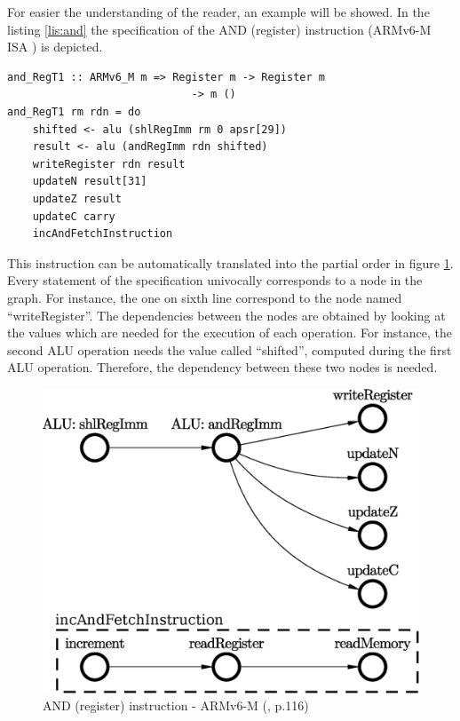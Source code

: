 \documentclass[conference]{IEEEtran}
\begin{document}
For easier the understanding of the reader, an example will be showed. In the listing
\ref{lis:and} the specification of the AND (register) instruction (ARMv6-M ISA
\cite{armManual}) is depicted.

\begin{lstlisting}[caption="AND (register) instruction - Haskell-based specification",
frame=single, label=lis:and]
and_RegT1 :: ARMv6_M m => Register m -> Register m 
			 				 -> m ()
and_RegT1 rm rdn = do
    shifted <- alu (shlRegImm rm 0 apsr[29])
    result <- alu (andRegImm rdn shifted)
    writeRegister rdn result
    updateN result[31]
    updateZ result
    updateC carry
    incAndFetchInstruction
\end{lstlisting}

\noindent
This instruction can be automatically translated into the partial order in figure
\ref{fig:andPO}. Every statement of the specification univocally corresponds to a node in the
graph. For instance, the one on sixth line correspond to the node named ``writeRegister''.
The dependencies between the nodes are obtained by looking at the values which are needed for
the execution of each operation. For instance, the second ALU operation needs the value
called ``shifted'', computed during the first ALU operation. Therefore, the dependency
between these two nodes is needed.

\begin{figure}[ht!]
\begin{center}
	\includegraphics[width=\linewidth]{IMG/and_RegT1.eps}
	\caption{AND (register) instruction - ARMv6-M (\cite{armManual}, p.116)}
	\label{fig:andPO}
\end{center}
\end{figure}
\end{document}
